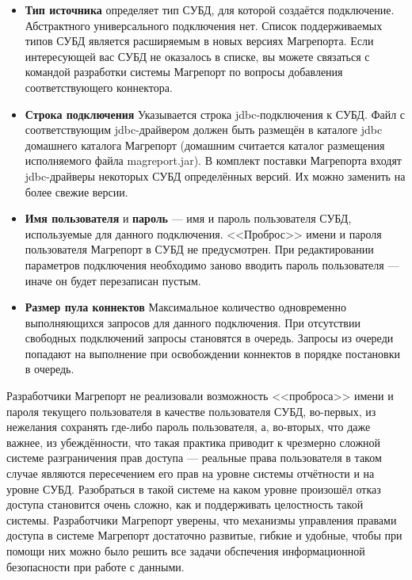 \documentclass[../user-manual.tex]{subfiles}
\begin{document}
	\begin{itemize}
		\item \textbf{Тип источника} определяет тип СУБД, для которой создаётся подключение. Абстрактного универсального подключения нет. Список поддерживаемых типов СУБД является расширяемым в новых версиях Магрепорта. Если интересующей вас СУБД не оказалось в списке, вы можете связаться с командой разработки системы Магрепорт по вопросы добавления соответствующего коннектора.
		
		\item \textbf{Строка подключения} Указывается строка jdbc-подключения к СУБД. Файл с соответствующим jdbc-драйвером должен быть размещён в каталоге jdbc домашнего каталога Магрепорт (домашним считается каталог размещения исполняемого файла magreport.jar). В комплект поставки Магрепорта входят jdbc-драйверы некоторых СУБД определённых версий. Их можно заменить на более свежие версии.
		
		\item \textbf{Имя пользователя} и \textbf{пароль} --- имя и пароль пользователя СУБД, используемые для данного подключения. <<Проброс>> имени и пароля пользователя Магрепорт в СУБД не предусмотрен. При редактировании параметров подключения необходимо заново вводить пароль пользователя --- иначе он будет перезаписан пустым.
		
		\item \textbf{Размер пула коннектов} Максимальное количество одновременно выполняющихся запросов для данного подключения. При отсутствии свободных подключений запросы становятся в очередь. Запросы из очереди попадают на выполнение при освобождении коннектов в порядке постановки в очередь.
		
	\end{itemize}

	\begin{concept}
		Разработчики Магрепорт не реализовали возможность <<проброса>> имени и пароля текущего пользователя в качестве пользователя СУБД, во-первых, из нежелания сохранять где-либо пароль пользователя, а, во-вторых, что даже важнее, из убеждённости, что такая практика приводит к чрезмерно сложной системе разграничения прав доступа --- реальные права пользователя в таком случае являются пересечением его прав на уровне системы отчётности и на уровне СУБД. Разобраться в такой системе на каком уровне произошёл отказ доступа становится очень сложно, как и поддерживать целостность такой системы. Разработчики Магрепорт уверены, что механизмы управления правами доступа в системе Магрепорт достаточно развитые, гибкие и удобные, чтобы при помощи них можно было решить все задачи обспечения информационной безопасности при работе с данными. 
	\end{concept}
\end{document}
